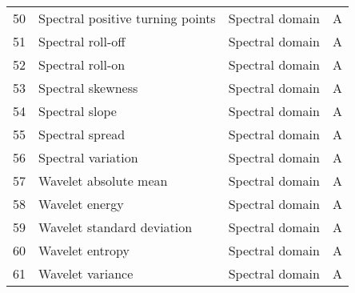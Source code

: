 \begin{tabularx}{\linewidth}{@{}rlcc@{}}
  50 & Spectral positive turning points         & Spectral domain  & A\\
  51 & Spectral roll-off         & Spectral domain  & A\\
  52 & Spectral roll-on         & Spectral domain  & A\\
  53 & Spectral skewness         & Spectral domain  & A\\
  54 & Spectral slope         & Spectral domain  & A\\
  55 & Spectral spread         & Spectral domain  & A\\
  56 & Spectral variation         & Spectral domain  & A\\
  57 & Wavelet absolute mean         & Spectral domain  & A\\
  58 & Wavelet energy         & Spectral domain  & A\\
  59 & Wavelet standard deviation         & Spectral domain  & A\\
  60 & Wavelet entropy         & Spectral domain  & A\\
  61 & Wavelet variance         & Spectral domain  & A\\

\end{tabularx}



